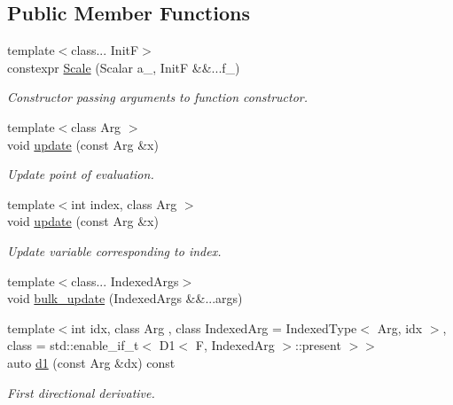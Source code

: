 \subsection*{Public Member Functions}
\begin{DoxyCompactItemize}
\item 
{\footnotesize template$<$class... InitF$>$ }\\constexpr \hyperlink{structFunG_1_1MathematicalOperations_1_1Scale_a0bb1b4813b18b40cca706d8bc501688d}{Scale} (Scalar a\+\_\+, InitF \&\&...f\+\_\+)
\begin{DoxyCompactList}\small\item\em Constructor passing arguments to function constructor. \end{DoxyCompactList}\item 
{\footnotesize template$<$class Arg $>$ }\\void \hyperlink{structFunG_1_1MathematicalOperations_1_1Scale_a72b90a29758d4a15e4c82c60d9692519}{update} (const Arg \&x)
\begin{DoxyCompactList}\small\item\em Update point of evaluation. \end{DoxyCompactList}\item 
{\footnotesize template$<$int index, class Arg $>$ }\\void \hyperlink{structFunG_1_1MathematicalOperations_1_1Scale_ad3bc61a8b77167ff35d7b6027e2146b6}{update} (const Arg \&x)
\begin{DoxyCompactList}\small\item\em Update variable corresponding to index. \end{DoxyCompactList}\item 
{\footnotesize template$<$class... Indexed\+Args$>$ }\\void \hyperlink{structFunG_1_1MathematicalOperations_1_1Scale_a794a3c29b8c39fbadd0a059b170e8983}{bulk\+\_\+update} (Indexed\+Args \&\&...args)
\item 
{\footnotesize template$<$int idx, class Arg , class Indexed\+Arg  = Indexed\+Type$<$ Arg, idx $>$, class  = std\+::enable\+\_\+if\+\_\+t$<$ D1$<$ F, Indexed\+Arg $>$\+::present $>$$>$ }\\auto \hyperlink{structFunG_1_1MathematicalOperations_1_1Scale_a3faeb9f1eac07cd6b73004dabadf665b}{d1} (const Arg \&dx) const 
\begin{DoxyCompactList}\small\item\em First directional derivative. \end{DoxyCompactList}\item 

\end{DoxyCompactItemize}
